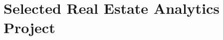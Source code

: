 \documentclass[11pt,a4paper,sans]{moderncv} %
\makeatletter
\newcommand*{\customcawards}[4]{
  \begin{tabular}{@{}l}
    {#2}
  \end{tabular}
  \hfill%
  \begin{tabular}{l@{}}
      \bfseries \itshape #3
  \end{tabular}
  \ifx&#4&%
  \else{\\%
    \begin{minipage}{\maincolumnwidth}%
      #4%
    \end{minipage}}\fi%
  \par\addvspace{#1}}
\makeatother
\begin{document}




\section{Selected Real Estate Analytics Project}
\end{document}

